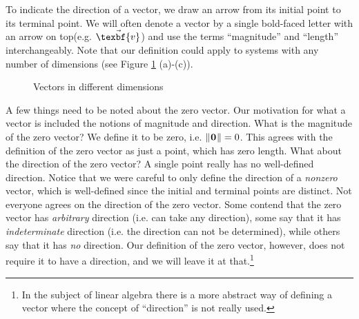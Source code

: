 
To indicate the direction of a vector, we draw an arrow from its initial point to its terminal
point. We will often denote a vector by a single bold-faced letter  with an arrow on top(e.g. $\vec{\texbf{v}}$) and use the terms
``magnitude'' and ``length'' interchangeably.
Note that our definition could apply to systems with any number of dimensions (see Figure \ref{fig:vecs}
(a)-(c)).

\begin{figure}[h]
 \centering
 \qquad
 \qquad
 \caption[]{\quad Vectors in different dimensions}
 \label{fig:vecs}
\end{figure}
\newpage
A few things need to be noted about the zero vector.
Our motivation for what a vector is included the notions of
magnitude and direction. What is the magnitude of the zero vector? We define it to be zero, i.e.
$\lVert\mspace{1mu}\textbf{0}\mspace{1mu}\rVert = 0$.
This agrees with the definition of the zero vector as just a point, which has zero length.  What about the
direction of the zero vector?  A single point really has no well-defined direction.  Notice that we were careful
to only define the direction of a \emph{nonzero} vector, which is well-defined since the initial and
terminal points are distinct.
Not everyone agrees on the direction of the zero vector.  Some contend that the zero vector has \emph{arbitrary}
direction (i.e. can take any direction), some say that it has \emph{indeterminate} direction (i.e. the direction can
not be determined), while others say that it has \emph{no} direction. Our definition of the zero vector, however,
does not require it to have a direction, and we will leave it at that.\footnote{In the subject of linear algebra
there is a more abstract way of defining a vector where the concept of ``direction'' is not really used.}

